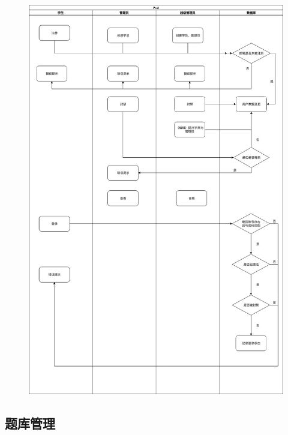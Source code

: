 \documentclass{article}
\begin{document}
        \begin{figure}[H]
            \centering
            \includegraphics[width=.8\textwidth]{./UserManageMent.jpg}
        \end{figure}

    \subsection{题库管理}
    
\end{document}
